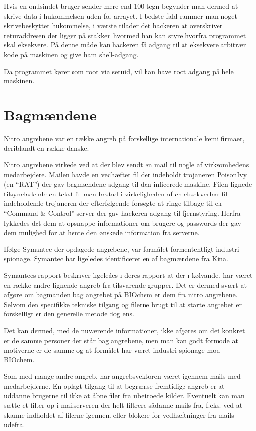 \documentclass[10pt,a4paper,danish]{article}
\begin{document}
Hvis en ondsindet bruger sender mere end 100 tegn begynder man dermed at skrive
data i hukommelsen uden for arrayet.
I bedste fald rammer man noget skrivebeskyttet hukommelse, i værste tilader det
hackeren at overskriver returaddresen der ligger på stakken hvormed han kan
styre hvorfra programmet skal eksekvere. På denne måde kan hackeren få adgang
til at eksekvere arbitrær kode på maskinen og give ham shell-adgang.

Da programmet kører som root via setuid, vil han have root adgang på hele
maskinen.

\section{Bagmændene}
Nitro angrebene var en række angreb på forskellige internationale kemi firmaer,
deriblandt en række danske.

Nitro angrebene virkede ved at der blev sendt en mail til nogle af virksomhedens
medarbejdere. Mailen havde en vedhæftet fil der indeholdt trojaneren PoisonIvy
(en ``RAT'') der gav bagmændene adgang til
den inficerede maskine. Filen lignede tilsyneladende en tekst fil men bestod i
virkeligheden af en eksekverbar fil indeholdende trojaneren der efterfølgende
forsøgte at ringe tilbage til en ``Command \& Control'' server der gav hackeren
adgang til fjernstyring.
Herfra lykkedes det dem at opsnappe informationer om
brugere og passwords der gav dem mulighed for at hente den ønskede information
fra serverne.

Ifølge Symantec der opdagede angrebene, var formålet formententligt industri
spionage. Symantec har ligeledes identificeret en af bagmændene fra Kina.

Symantecs rapport\cite{nitro-article} beskriver ligeledes i deres rapport at der i kølvandet har været en
række andre lignende angreb fra tilsvarende grupper. Det er dermed svært at
afgøre om bagmanden bag angrebet på BIOchem er dem fra nitro angrebene.
Selvom den specifikke tekniske tilgang og filerne brugt til at starte angrebet
er forskelligt er den generelle metode dog ens.

Det kan dermed, med de nuværende informationer, ikke afgøres om det konkret er
de samme personer der står bag angrebene, men man kan godt formode at motiverne
er de samme og at formålet har været industri spionage mod BIOchem.


Som med mange andre angreb, har angrebsvektoren været igennem mails med
medarbejderne.
En oplagt tilgang til at begrænse fremtidige angreb er at uddanne brugerne til
ikke at åbne filer fra ubetroede kilder.
Eventuelt kan man sætte et filter op i mailserveren der helt filtrere sådanne
mails fra, f.eks. ved at skanne indholdet af filerne igennem eller blokere for
vedhæftninger fra mails udefra.
\end{document}
